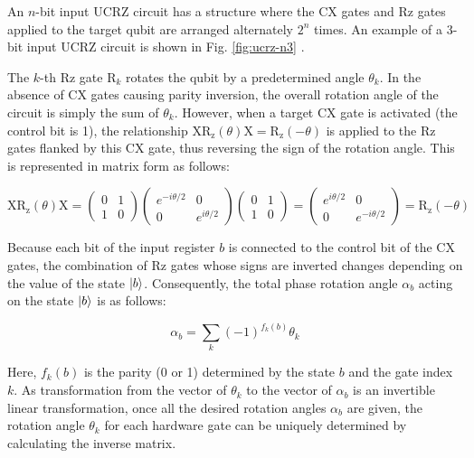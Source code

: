 \documentclass[jctc-draft.tex]{subfiles}
\begin{document}
An $n$-bit input UCRZ circuit has a structure where the CX gates and Rz gates
applied to the target qubit are arranged alternately $2^n$ times. An example of
a 3-bit input UCRZ circuit is shown in Fig. \ref{fig:ucrz-n3}
\cite{Mottonen2004.PhysRevLett.93.130502}.

The $k$-th Rz gate $\mathrm{R}_k$ rotates the qubit by a predetermined angle
$\theta_k$. In the absence of CX gates causing parity inversion, the overall
rotation angle of the circuit is simply the sum of $\theta_k$. However, when a
target CX gate is activated (the control bit is 1), the relationship
$\mathrm{X}\mathrm{R_z}(\theta)\mathrm{X} = \mathrm{R_z}(-\theta)$ is applied to
the Rz gates flanked by this CX gate, thus reversing the sign of the rotation angle.
This is represented in matrix form as follows:

\begin{equation}
    \mathrm{X}\mathrm{R_z}(\theta)\mathrm{X} = 
    \begin{pmatrix} 0 & 1 \\ 1 & 0 \end{pmatrix}
    \begin{pmatrix} e^{-i\theta/2} & 0 \\ 0 & e^{i\theta/2} \end{pmatrix}
    \begin{pmatrix} 0 & 1 \\ 1 & 0 \end{pmatrix}
    = \begin{pmatrix} e^{i\theta/2} & 0 \\ 0 & e^{-i\theta/2} \end{pmatrix}
    = \mathrm{R_z}(-\theta)
\end{equation}

Because each bit of the input register $b$ is connected to the control bit of
the CX gates, the combination of Rz gates whose signs are inverted changes
depending on the value of the state $\ket{b}$. Consequently, the total phase
rotation angle $\alpha_b$ acting on the state $\ket{b}$ is as follows:

\begin{equation}
    \alpha_b = \sum_{k}{(-1)^{f_k(b)}\theta_k}
\end{equation}

Here, $f_k(b)$ is the parity (0 or 1) determined by the state $b$ and the gate
index $k$. As transformation from the vector of $\theta_k$ to the vector
of $\alpha_b$ is an invertible linear transformation, once all the desired 
rotation angles $\alpha_b$ are given, the rotation angle $\theta_k$ for each
hardware gate can be uniquely determined by calculating the inverse matrix.
\end{document}

